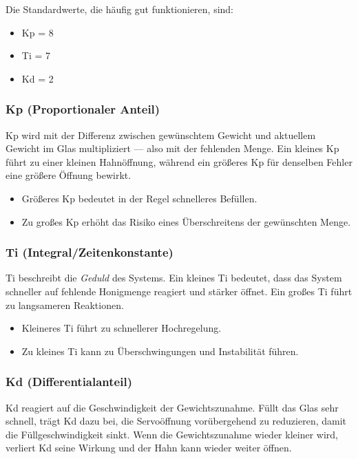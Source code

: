 \documentclass[11pt,a4paper]{article}
\begin{document}
Die Standardwerte, die häufig gut funktionieren, sind:
\begin{itemize}[leftmargin=*]
    \item Kp = 8
    \item Ti = 7
    \item Kd = 2
\end{itemize}

\subsubsection*{Kp (Proportionaler Anteil)}

Kp wird mit der Differenz zwischen gewünschtem Gewicht und aktuellem Gewicht im Glas multipliziert — also mit der fehlenden Menge. Ein kleines Kp führt zu einer kleinen Hahnöffnung, während ein größeres Kp für denselben Fehler eine größere Öffnung bewirkt.

\begin{itemize}[leftmargin=*]
    \item Größeres Kp bedeutet in der Regel schnelleres Befüllen.
    \item Zu großes Kp erhöht das Risiko eines Überschreitens der gewünschten Menge.
\end{itemize}

\subsubsection*{Ti (Integral/Zeitenkonstante)}

Ti beschreibt die \textit{Geduld} des Systems. Ein kleines Ti bedeutet, dass das System schneller auf fehlende Honigmenge reagiert und stärker öffnet. Ein großes Ti führt zu langsameren Reaktionen.

\begin{itemize}[leftmargin=*]
    \item Kleineres Ti führt zu schnellerer Hochregelung.
    \item Zu kleines Ti kann zu Überschwingungen und Instabilität führen.
\end{itemize}

\subsubsection*{Kd (Differentialanteil)}

Kd reagiert auf die Geschwindigkeit der Gewichtszunahme. Füllt das Glas sehr schnell, trägt Kd dazu bei, die Servoöffnung vorübergehend zu reduzieren, damit die Füllgeschwindigkeit sinkt. Wenn die Gewichtszunahme wieder kleiner wird, verliert Kd seine Wirkung und der Hahn kann wieder weiter öffnen.
\end{document}
